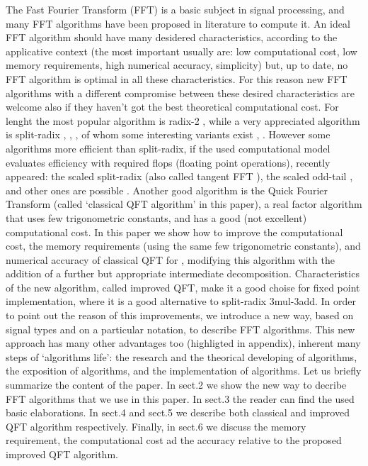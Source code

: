 \documentclass[a4paper,10pt]{article}
\begin{document}
The Fast Fourier Transform (FFT) is a basic subject in signal processing, and many FFT algorithms have been proposed in literature \cite{Duhamel_Vetterli_1990} to compute it.
An ideal FFT algorithm should have many desidered characteristics, according to the applicative context (the most important usually are: low computational cost, low memory requirements, high numerical accuracy, simplicity) but, up to date, no FFT algorithm is optimal in all these characteristics.
For this reason new FFT algorithms with a different compromise between these desired characteristics are welcome also if they haven't got the best theoretical computational cost.
For lenght  the most popular algorithm is radix-2 \cite{Cooley_Tuckey_1965}, while a very appreciated algorithm is split-radix \cite{Duhamel_Hollmann_1984}, \cite{Martens_1984}, \cite{Vetterli_Nussbaumer_1984}, of whom some interesting variants exist \cite{Bouguezel_2007}, \cite{Kamar_Elcherif_1989}.
However some algorithms more efficient than split-radix, if the used computational model evaluates efficiency with required flops (floating point operations), recently appeared: the scaled split-radix \cite{Johnson_Frigo_2007} (also called tangent FFT \cite{Bernstein_2007}), the scaled odd-tail \cite{Lundy_Van_Buskirk_2007}, and other ones are possible \cite{haynal:generating}.
Another good algorithm is the Quick Fourier Transform \cite{Guo_Sitton_qft_1994} (called `classical QFT algorithm' in this paper), a real factor algorithm that uses few trigonometric constants, and has a good (not excellent) computational cost.
In this paper we show how to improve the computational cost, the memory requirements (using the same few trigonometric constants), and numerical accuracy of classical QFT for , modifying this algorithm with the addition of a further but appropriate intermediate decomposition. 
Characteristics of the new algorithm, called improved QFT, make it a good choise for fixed point implementation, where it is a good alternative to split-radix 3mul-3add.
In order to point out the reason of this improvements, we introduce a new way, based on signal types and on a particular notation, to describe FFT algorithms.
This new approach has many other advantages too (highligted in appendix), inherent many steps of `algorithms life': the research and the theorical developing of algorithms, the exposition of algorithms, and the implementation of algorithms. 
Let us briefly summarize the content of the paper. 
In sect.2 we show the new way to decribe FFT algorithms that we use in this paper. 
In sect.3 the reader can find the used basic elaborations. 
In sect.4 and sect.5 we describe both classical and improved QFT algorithm respectively.
Finally, in sect.6 we discuss the memory requirement, the computational cost ad the accuracy relative to the proposed improved QFT algorithm.
\end{document}
